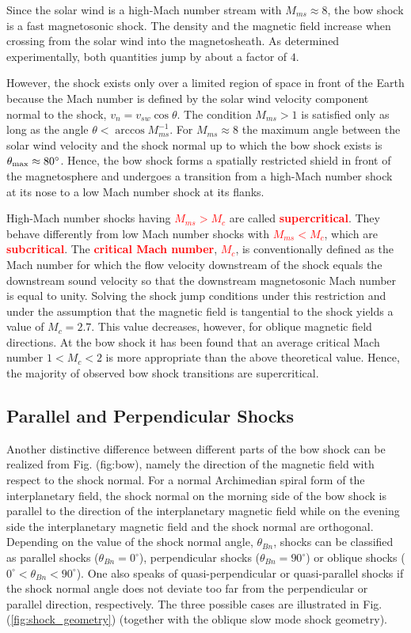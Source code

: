\documentclass[12pt,a4paper]{article}
\begin{document}
Since the solar wind is a high-Mach number stream with $M_{ms} \approx 8$, the bow shock is a fast magnetosonic shock. The density and the magnetic field increase when crossing from the solar wind into the magnetosheath. As determined experimentally, both quantities jump by about a factor of $4$.

However, the shock exists only over a limited region of space in front of the Earth because the Mach number is defined by the solar wind velocity component normal to the shock, $v_n = v_{sw} \cos \theta$. The condition $M_{ms}  > 1$ is satisfied only as long as the angle $\theta < \arccos M_{ms}^{-1}$. For $M_{ms} \approx 8$ the maximum angle between the solar wind velocity and the shock normal up to which the bow shock exists is $\theta_{\rm max} \approx 80^\circ$. Hence, the bow shock forms a spatially restricted shield in front of the magnetosphere and undergoes a transition from a high-Mach number shock at its nose to a low Mach number shock at its flanks.

High-Mach number shocks having \textcolor{red}{$M_{ms} > M_c$} are called \textcolor{red}{\bf supercritical}. They behave differently from low Mach number shocks with \textcolor{red}{$M_{ms} < M_c$}, which are \textcolor{red}{\bf subcritical}. The \textcolor{red}{\bf critical Mach number}, \textcolor{red}{$M_c$}, is conventionally defined as the Mach number for which the flow velocity downstream of the shock equals the downstream sound velocity so that the downstream magnetosonic Mach number is equal to unity. Solving the shock jump conditions under this restriction and under the assumption that the magnetic field is tangential to the shock yields a value of $M_c = 2.7$. This value decreases, however, for oblique magnetic field directions. At the bow shock it has been found that an average critical Mach number $1 < M_c < 2$ is more appropriate than the above theoretical value. Hence, the majority of observed bow shock transitions are supercritical.

\subsection{Parallel and Perpendicular Shocks}
\cite{1996bspp.book.....B} Another distinctive difference between different parts of the bow shock can be realized from Fig. ({fig:bow}), namely the direction of the magnetic field with respect to the shock normal. For a normal Archimedian spiral form of the interplanetary field, the shock normal on the morning side of the bow shock is parallel to the direction of the interplanetary magnetic field while on the evening side the interplanetary magnetic field and the shock normal are orthogonal. Depending on the value of the shock normal angle, $\theta_{Bn}$, shocks can be classified as parallel shocks ($\theta_{Bn} = 0^\circ$), perpendicular shocks ($\theta_{Bn} = 90^\circ$) or oblique shocks ($0^\circ < \theta_{Bn} < 90^\circ$). One also speaks of quasi-perpendicular or quasi-parallel shocks if the shock normal angle does not deviate too far from the perpendicular or parallel direction, respectively. The three possible cases are illustrated in Fig. (\ref{fig:shock_geometry}) (together with the oblique slow mode shock geometry).
\end{document}
